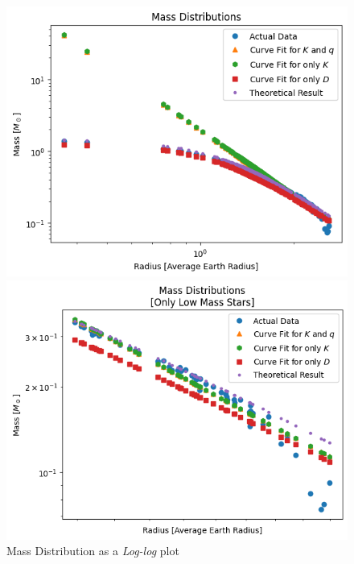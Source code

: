 \documentclass[letterpaper,12pt]{article}
\begin{document}
\begin{figure}[H]
\begin{minipage}{.5\textwidth}
\centerline{\includegraphics[width=\linewidth]{figures/appendix/2_2_7_n_ll_ms_r.png}}
\end{minipage}
\begin{minipage}{.5\textwidth}
\centerline{\includegraphics[width=\linewidth]{figures/appendix/2_2_8_n_ll_ms_r_.png}}
\end{minipage}
\caption{Mass Distribution as a \textit{Log-log} plot}
\end{figure}
\end{document}
